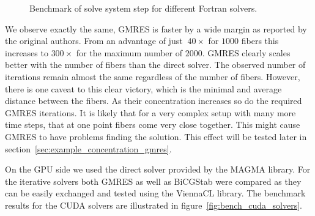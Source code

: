 \documentclass[a4paper,11pt]{kth-mag}
\begin{document}
\begin{figure}[!htbp]
  \centering
  \caption{Benchmark of solve system step for different Fortran solvers.}
  \label{fig:bench_openmp_solvers}
\end{figure}

We observe exactly the same, GMRES is faster by a wide margin as reported by the original authors\cite{Tornberg2006}. From an advantage of just $~40×$ for $1000$ fibers this increases to $300×$ for the maximum number of $2000$. GMRES clearly scales better with the number of fibers than the direct solver. The observed number of iterations remain almost the same regardless of the number of fibers. However, there is one caveat to this clear victory, which is the minimal and average distance between the fibers. As their concentration increases so do the required GMRES iterations. It is likely that for a very complex setup with many more time steps, that at one point fibers come very close together. This might cause GMRES to have problems finding the solution. This effect will be tested later in section~\ref{sec:example_concentration_gmres}.

On the GPU side we used the direct solver provided by the MAGMA library. For the iterative solvers both GMRES as well as BiCGStab were compared as they can be easily exchanged and tested using the ViennaCL library. The benchmark results for the CUDA solvers are illustrated in figure~\ref{fig:bench_cuda_solvers}.
\end{document}

